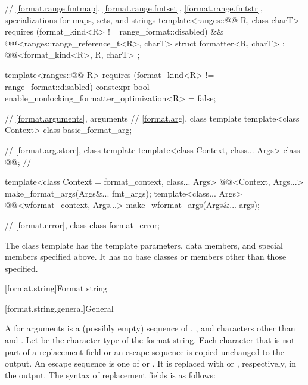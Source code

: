 \begin{codeblock}
{  // \ref{format.range.fmtmap}, \ref{format.range.fmtset}, \ref{format.range.fmtstr}, specializations for maps, sets, and strings
  template<ranges::@@ R, class charT>
    requires (format_kind<R> != range_format::disabled) &&
             @@<ranges::range_reference_t<R>, charT>
  struct formatter<R, charT> : @@<format_kind<R>, R, charT> { };

  template<ranges::@@ R>
      requires (format_kind<R> != range_format::disabled)
    constexpr bool enable_nonlocking_formatter_optimization<R> = false;

  // \ref{format.arguments}, arguments
  // \ref{format.arg}, class template 
  template<class Context> class basic_format_arg;

  // \ref{format.arg.store}, class template 
  template<class Context, class... Args> class @@;        // \expos

  template<class Context = format_context, class... Args>
    @@<Context, Args...>
      make_format_args(Args&... fmt_args);
  template<class... Args>
    @@<wformat_context, Args...>
      make_wformat_args(Args&... args);

  // \ref{format.error}, class 
  class format_error;
}
\end{codeblock}


\pnum
The class template 
has the template parameters, data members, and special members specified above. It has no base classes or members other than those specified.

[format.string]{Format string}

[format.string.general]{General}

\pnum
A  for arguments  is
a (possibly empty) sequence of
,
,
and characters other than \tcode{\{} and \tcode{\}}.
Let  be the character type of the format string.
Each character that is not part of
a replacement field or an escape sequence
is copied unchanged to the output.
An escape sequence is one of \tcode{\{\{} or \tcode{\}\}}.
It is replaced with \tcode{\{} or \tcode{\}}, respectively, in the output.
The syntax of replacement fields is as follows:

